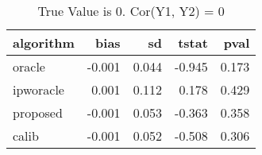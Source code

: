 \begin{table}[h!]

\caption{True Value is 0. Cor(Y1, Y2) = 0}
\centering
\begin{tabular}[t]{lrrrr}
\toprule
algorithm & bias & sd & tstat & pval\\
\midrule
oracle & -0.001 & 0.044 & -0.945 & 0.173\\
ipworacle & 0.001 & 0.112 & 0.178 & 0.429\\
proposed & -0.001 & 0.053 & -0.363 & 0.358\\
calib & -0.001 & 0.052 & -0.508 & 0.306\\
\bottomrule
\end{tabular}
\end{table}
